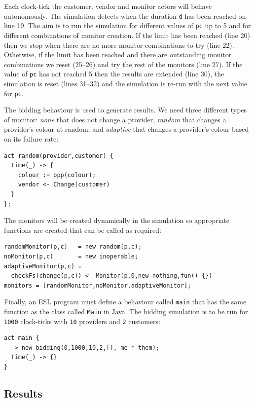 \documentclass[10pt,numbers]{sigplanconf}
\def\code#1{{\normalfont\lstinline[basicstyle=\small\ttfamily]{#1}}}
\begin{document}
Each clock-tick the customer, vendor and monitor actors will behave autonomously. The simulation detects when the duration \code{d} has been reached on line 19. The aim is to run the simulation for different values of \code{pc} up to 5 and for different combinations of monitor creation. If the limit has been reached (line 20) then we stop when there are no more monitor combinations to try (line 22). Otherwise, if the limit has been reached and there are outstanding monitor combinations we reset (25--26) and try the rest of the monitors (line 27).
%
If the value of \code{pc} has not reached 5 then the results are extended (line 30), the simulation is reset (lines 31--32) and the simulation is re-run with the next value for \code{pc}.

The bidding behaviour is used to generate results. We need three different types of monitor: {\it none} that does not change a provider, {\it random} that changes a provider's colour at random, and {\it adaptive} that changes a provider's colour based on its failure rate:
\begin{lstlisting}
act random(provider,customer) {
  Time(_) -> {
    colour := opp(colour); 
    vendor <- Change(customer) 
  }
};
\end{lstlisting}
The monitors will be created dynamically in the simulation so appropriate functions are created that can be called as required:
\begin{lstlisting}
randomMonitor(p,c)   = new random(p,c);
noMonitor(p,c)       = new inoperable;
adaptiveMonitor(p,c) = 
  checkFs(change(p,c)) <- Monitor(p,0,new nothing,fun() {})
monitors = [randomMonitor,noMonitor,adaptiveMonitor];
\end{lstlisting}
Finally, an ESL program must define a behaviour called \code{main} that has the same function as the class called \code{Main} in Java. The bidding simulation is to be run for \code{1000} clock-ticks with \code{10} providers and \code{2} customers:
\begin{lstlisting}
act main {
  -> new bidding(0,1000,10,2,[], me * them);
  Time(_) -> {}
}
\end{lstlisting}

\subsection{Results}
\end{document}
